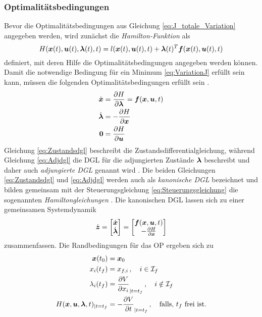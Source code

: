 \subsubsection{Optimalitätsbedingungen}\label{subsubsec:Optimalitätsbedingungen}
Bevor die Optimalitätsbedingungen aus Gleichung \eqref{eq:J_totale_Variation} angegeben werden, wird zunächst die \textit{Hamilton-Funktion} als 
\begin{equation}
	H(\boldsymbol{x}(t),\boldsymbol{u}(t),\boldsymbol{\lambda}(t),t) = l(\boldsymbol{x}(t),\boldsymbol{u}(t),t) + \boldsymbol{\lambda}(t)^T\boldsymbol{f}(\boldsymbol{x}(t),\boldsymbol{u}(t),t) \label{eq:Hamilton}
\end{equation}
definiert, mit deren Hilfe die Optimalitätsbedingungen angegeben werden können. Damit die notwendige Bedingung für ein Minimum \eqref{eq:VariationJ} erfüllt sein kann, müssen die folgenden Optimalitätsbedingungen erfüllt sein \cite{KnutGraichen.2012}.
\begin{align}
	\dot{\boldsymbol{x}} &= \frac{\partial H}{\partial\boldsymbol{\lambda}} = \boldsymbol{f}(\boldsymbol{x},\boldsymbol{u},t) \label{eq:Zustandsdgl} \\
	\dot{\boldsymbol{\lambda}} &= -\frac{\partial H}{\partial \boldsymbol{x}} \label{eq:Adjdgl} \\
	\boldsymbol{0} &= \frac{\partial H}{\partial \boldsymbol{u}} \label{eq:Steuerungsgleichung} 
\end{align}
Gleichung \eqref{eq:Zustandsdgl} beschreibt die Zustandsdifferentialgleichung, während Gleichung \eqref{eq:Adjdgl} die \gls{DGL} für die adjungierten Zustände $\boldsymbol{\lambda}$ beschreibt und daher auch \textit{adjungierte \gls{DGL}} genannt wird \cite{Konigorski.2019}. Die beiden Gleichungen \eqref{eq:Zustandsdgl} und \eqref{eq:Adjdgl} werden auch als \textit{kanonische \gls{DGL}} bezeichnet und bilden gemeinsam mit der Steuerungsgleichung \eqref{eq:Steuerungsgleichung} die sogenannten \textit{Hamiltongleichungen} \cite{Konigorski.2019}. Die kanonischen \gls{DGL} lassen sich zu einer gemeinsamen Systemdynamik 
\begin{equation}
	\dot{\boldsymbol{z}} = \begin{bmatrix}
	\dot{\boldsymbol{x}} \\
	\dot{\boldsymbol{\lambda}}
	\end{bmatrix} = 
	\begin{bmatrix}
	\boldsymbol{f}(\boldsymbol{x},\boldsymbol{u},t) \\
	-\frac{\partial H}{\partial \boldsymbol{x}}
	\end{bmatrix} \label{eq:Sysdyn_z}
\end{equation}
zusammenfassen.
Die Randbedingungen für das \gls{OP} ergeben sich zu \cite{KnutGraichen.2012}
\begin{align}
\boldsymbol{x}(t_0) &= \boldsymbol{x}_0 \label{eq:Anfangswerte} \\
x_i(t_f) &= x_{f,i}\,, \quad i \in\mathcal{I}_f \label{eq:Endwerte} \\
\lambda_i(t_f) &= \frac{\partial V}{\partial x_i}_{|t=t_f}\,, \quad i \notin \mathcal{I}_f \label{eq:Lambdaend} \\
H(\boldsymbol{x},\boldsymbol{u},\boldsymbol{\lambda},t)_{|t=t_f} &= -\frac{\partial V}{\partial t}_{|t=t_f}\,,\quad \textrm{falls, $t_f$ frei ist.} \label{eq:Transversalitaet}
\end{align}
